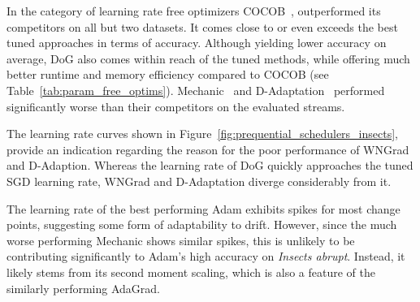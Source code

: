 \documentclass[runningheads]{llncs}
\begin{document}
In the category of learning rate free optimizers COCOB~\cite{orabonaTrainingDeepNetworks2017}, outperformed its competitors on all but two datasets.
It comes close to or even exceeds the best tuned approaches in terms of accuracy.
Although yielding lower accuracy on average, DoG also comes within reach of the tuned methods, while offering much better runtime and memory efficiency compared to COCOB (see Table~\ref{tab:param_free_optims}).
Mechanic~\cite{cutkoskyMechanicLearningRate2023} and D-Adaptation~\cite{defazioLearningRateFreeLearningDAdaptation2023a} performed significantly worse than their competitors on the evaluated streams.

The learning rate curves shown in Figure~\ref{fig:prequential_schedulers_insects}, provide an indication regarding the reason for the poor performance of WNGrad and D-Adaption.
Whereas the learning rate of DoG quickly approaches the tuned SGD learning rate, WNGrad and D-Adaptation diverge considerably from it.

The learning rate of the best performing Adam exhibits spikes for most change points, suggesting some form of adaptability to drift.
However, since the much worse performing Mechanic shows similar spikes, this is unlikely to be contributing significantly to Adam's high accuracy on \textit{Insects abrupt}.
Instead, it likely stems from its second moment scaling, which is also a feature of the similarly performing AdaGrad.
\end{document}
